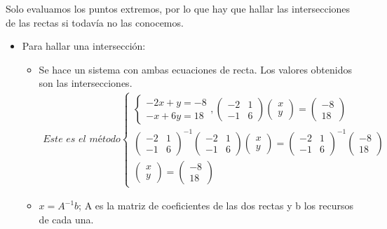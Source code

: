 \documentclass[12pt, twoside, openright]{report} %
\begin{document}
	  Solo evaluamos los puntos extremos, por lo que hay que hallar las
      intersecciones de las rectas si todavía no las conocemos.
	  \begin{itemize}
		  \item Para hallar una intersección: 
		  \begin{itemize}
			  \item Se hace un sistema con ambas
			  ecuaciones de recta. Los valores obtenidos son las intersecciones.
			  \begin{eqnarray*}
				\textit{Este es el método}\left\{\begin{matrix}
					\left\{\begin{matrix}
					-2x+y=-8\\ 
					-x+6y=18
					\end{matrix}\right.
					,
					\begin{pmatrix}
					-2 & 1 \\ 
					-1 & 6
					\end{pmatrix}
					\begin{pmatrix}
					x \\ 
					y
					\end{pmatrix}
					=
					\begin{pmatrix}
					-8 \\ 
					18
					\end{pmatrix}\\ 
					\begin{pmatrix}
					-2 & 1 \\ 
					-1 & 6
					\end{pmatrix}^{-1}
					\begin{pmatrix}
					-2 & 1 \\ 
					-1 & 6
					\end{pmatrix}
					\begin{pmatrix}
					x \\ 
					y
					\end{pmatrix}
					=
					\begin{pmatrix}
					-2 & 1 \\ 
					-1 & 6
					\end{pmatrix}^{-1}
					\begin{pmatrix}
					-8 \\ 
					18
					\end{pmatrix}\\ 
					\begin{pmatrix}
					x \\ 
					y
					\end{pmatrix}
					=
					
					\begin{pmatrix}
					-8 \\ 
					18
					\end{pmatrix}\end{matrix}\right.
			  \end{eqnarray*}
			  \item
			  \(x= A^{-1}b\); A es la matriz de coeficientes de las dos rectas
			  y b los recursos de cada una.
		  \end{itemize}
		 
	  \end{itemize}
\end{document}
